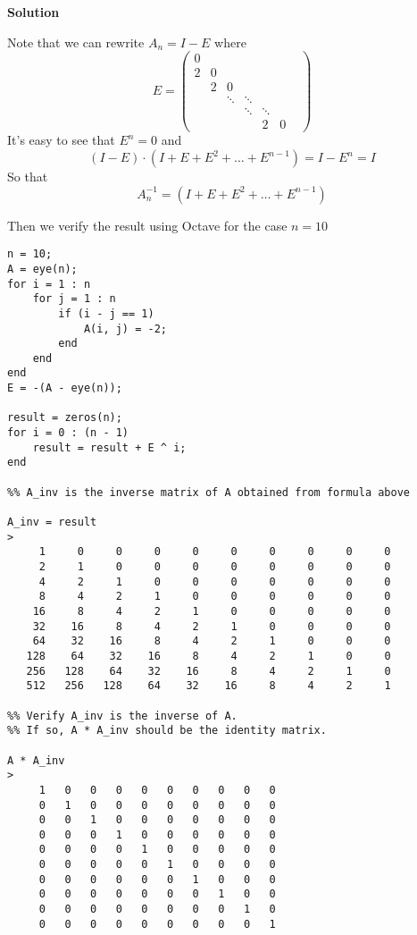 \documentclass[12pt,oneside,a4paper]{article}
\newcommand{\solution}
{
    \vspace{15pt}
    \noindent\ignorespaces\textbf{\large Solution}\par
}
\begin{document}
\solution
Note that we can rewrite $A_{n} = I - E$ where 
$$E = \begin{pmatrix}
0 &  & & & & &\\
2& 0& & & & &\\
  &  2& 0&  & & &\\
  & &\ddots&\ddots& & &\\
  &  & & \ddots & \ddots & &\\
    & &  & & 2 & 0
\end{pmatrix}$$
It's easy to see that $E^n = 0$ and 
$$(I - E)\cdot(I + E + E^2 + \dots + E^{n-1}) = I - E^{n} = I$$
So that 
$$A_{n}^{-1} = (I + E + E^2 + \dots + E^{n-1})$$

Then we verify the result using Octave for the case $n = 10$
\begin{verbatim}
n = 10;
A = eye(n);
for i = 1 : n
    for j = 1 : n
        if (i - j == 1)
            A(i, j) = -2;
        end
    end
end
E = -(A - eye(n));

result = zeros(n);
for i = 0 : (n - 1)
    result = result + E ^ i;
end

%% A_inv is the inverse matrix of A obtained from formula above

A_inv = result
>
     1     0     0     0     0     0     0     0     0     0
     2     1     0     0     0     0     0     0     0     0
     4     2     1     0     0     0     0     0     0     0
     8     4     2     1     0     0     0     0     0     0
    16     8     4     2     1     0     0     0     0     0
    32    16     8     4     2     1     0     0     0     0
    64    32    16     8     4     2     1     0     0     0
   128    64    32    16     8     4     2     1     0     0
   256   128    64    32    16     8     4     2     1     0
   512   256   128    64    32    16     8     4     2     1

%% Verify A_inv is the inverse of A. 
%% If so, A * A_inv should be the identity matrix.

A * A_inv
>
     1   0   0   0   0   0   0   0   0   0
     0   1   0   0   0   0   0   0   0   0
     0   0   1   0   0   0   0   0   0   0
     0   0   0   1   0   0   0   0   0   0
     0   0   0   0   1   0   0   0   0   0
     0   0   0   0   0   1   0   0   0   0
     0   0   0   0   0   0   1   0   0   0
     0   0   0   0   0   0   0   1   0   0
     0   0   0   0   0   0   0   0   1   0
     0   0   0   0   0   0   0   0   0   1
\end{verbatim}
\end{document}
